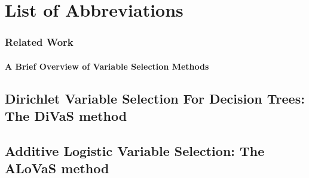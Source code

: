 \documentclass[12pt]{article}
\def\listofabbreviations{ \clearpage}
\begin{document}
\clearpage
{}
\chapter{\LARGE{\textbf{List of Abbreviations}}}
\listofabbreviations
\pagebreak

\cleardoublepage
{}



 
 

\subsection{Related Work}
\label{ch:related}



\subsubsection{A Brief Overview of Variable Selection Methods}






 \section{Dirichlet Variable Selection For Decision Trees: The DiVaS method}
\label{ch:var_select}



\section{Additive Logistic Variable Selection: The ALoVaS method}












\pagebreak



\pagebreak

%




\end{document}
